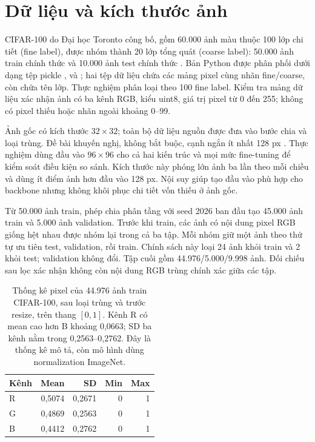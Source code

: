 \documentclass[12pt,a4paper]{report}
\begin{document}
\section{Dữ liệu và kích thước ảnh}
CIFAR-100 do Đại học Toronto công bố, gồm 60.000 ảnh màu thuộc 100 lớp chi tiết (fine label), được nhóm thành 20 lớp tổng quát (coarse label): 50.000 ảnh train chính thức và 10.000 ảnh test chính thức \cite{cifar}. Bản Python được phân phối dưới dạng tệp pickle ,  và ; hai tệp dữ liệu chứa các mảng pixel cùng nhãn fine/coarse, còn  chứa tên lớp. Thực nghiệm phân loại theo 100 fine label. Kiểm tra mảng dữ liệu xác nhận ảnh có ba kênh RGB, kiểu uint8, giá trị pixel từ 0 đến 255; không có pixel thiếu hoặc nhãn ngoài khoảng 0–99.

Ảnh gốc có kích thước $32\times32$; toàn bộ dữ liệu nguồn được đưa vào bước chia và loại trùng. Đề bài khuyến nghị, không bắt buộc, cạnh ngắn ít nhất 128 px \cite{assignment}. Thực nghiệm dùng đầu vào $96\times96$ cho cả hai kiến trúc và mọi mức fine-tuning để kiểm soát điều kiện so sánh. Kích thước này phóng lớn ảnh ba lần theo mỗi chiều và dùng ít điểm ảnh hơn đầu vào 128 px. Nội suy giúp tạo đầu vào phù hợp cho backbone nhưng không khôi phục chi tiết vốn thiếu ở ảnh gốc.

Từ 50.000 ảnh train, phép chia phân tầng với seed 2026 ban đầu tạo 45.000 ảnh train và 5.000 ảnh validation. Trước khi train, các ảnh có nội dung pixel RGB giống hệt nhau được nhóm lại trong cả ba tập. Mỗi nhóm giữ một ảnh theo thứ tự ưu tiên test, validation, rồi train. Chính sách này loại 24 ảnh khỏi train và 2 khỏi test; validation không đổi. Tập cuối gồm 44.976/5.000/9.998 ảnh. Đối chiếu sau lọc xác nhận không còn nội dung RGB trùng chính xác giữa các tập.

\begin{table}[htbp]\centering\small
\begin{tabular}{lrrrr}\toprule
Kênh & Mean & SD & Min & Max\\\midrule
R & 0,5074 & 0,2671 & 0 & 1\\
G & 0,4869 & 0,2563 & 0 & 1\\
B & 0,4412 & 0,2762 & 0 & 1\\\bottomrule
\end{tabular}
\caption{Thống kê pixel của 44.976 ảnh train CIFAR-100, sau loại trùng và trước resize, trên thang $[0,1]$. Kênh R có mean cao hơn B khoảng 0,0663; SD ba kênh nằm trong 0,2563–0,2762. Đây là thống kê mô tả, còn mô hình dùng normalization ImageNet.}
\label{tab:image-rgb}
\end{table}
\end{document}
